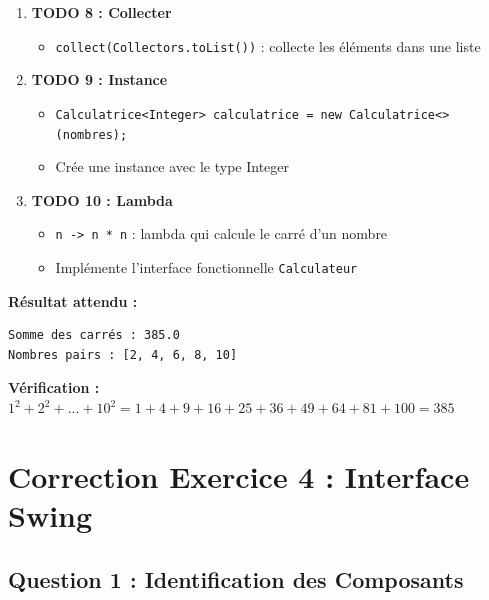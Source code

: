 \documentclass[11pt,a4paper]{article}
\begin{document}
\begin{correctionbox}
\begin{enumerate}
    \item \textbf{TODO 8 : Collecter}
    \begin{itemize}
        \item \texttt{collect(Collectors.toList())} : collecte les éléments dans une liste
    \end{itemize}
    
    \item \textbf{TODO 9 : Instance}
    \begin{itemize}
        \item \texttt{Calculatrice<Integer> calculatrice = new Calculatrice<>(nombres);}
        \item Crée une instance avec le type Integer
    \end{itemize}
    
    \item \textbf{TODO 10 : Lambda}
    \begin{itemize}
        \item \texttt{n -> n * n} : lambda qui calcule le carré d'un nombre
        \item Implémente l'interface fonctionnelle \texttt{Calculateur}
    \end{itemize}
\end{enumerate}

\textbf{Résultat attendu :}
\begin{verbatim}
Somme des carrés : 385.0
Nombres pairs : [2, 4, 6, 8, 10]
\end{verbatim}

\textbf{Vérification :} $1^2 + 2^2 + ... + 10^2 = 1 + 4 + 9 + 16 + 25 + 36 + 49 + 64 + 81 + 100 = 385$
\end{correctionbox}

\newpage

\section{Correction Exercice 4 : Interface Swing}

\subsection{Question 1 : Identification des Composants}
\end{document}

